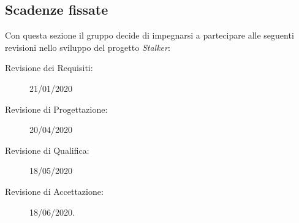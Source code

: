 \documentclass[../piano-di-progetto.tex]{subfiles}
\begin{document}
\subsection{Scadenze fissate}%
\label{sub:scadenze_fissate}
Con questa sezione il gruppo decide di impegnarsi a partecipare alle seguenti revisioni nello sviluppo del progetto \textit{Stalker}:
  \begin{description}
    \item[Revisione dei Requisiti:] 21/01/2020
    \item[Revisione di Progettazione:] 20/04/2020
    \item[Revisione di Qualifica:] 18/05/2020
    \item[Revisione di Accettazione:] 18/06/2020.
  \end{description}
\end{document}
